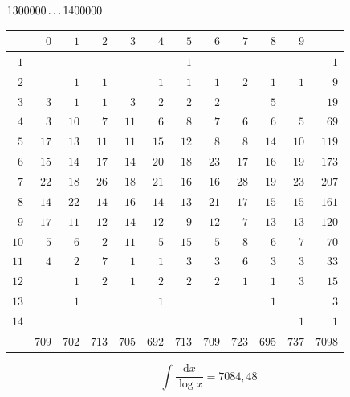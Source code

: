 \par\medskip
\noindent\begin{minipage}{\linewidth}\centering
{}
\(1300000\mathinner{.\,.\,.}1400000\)\par\smallskip
\begingroup\fontsize{10.5}{11.5}\selectfont\setlength{\tabcolsep}{3.5pt}\renewcommand{\arraystretch}{1}
\begin{tabular}{r|rrrrrrrrrr|r}\hline
 & $0$ & $1$ & $2$ & $3$ & $4$ & $5$ & $6$ & $7$ & $8$ & $9$ &  \\ \hline
$1$ &  &  &  &  &  & $1$ &  &  &  &  & $1$ \\
$2$ &  & $1$ & $1$ &  & $1$ & $1$ & $1$ & $2$ & $1$ & $1$ & $9$ \\
$3$ & $3$ & $1$ & $1$ & $3$ & $2$ & $2$ & $2$ &  & $5$ &  & $19$ \\
$4$ & $3$ & $10$ & $7$ & $11$ & $6$ & $8$ & $7$ & $6$ & $6$ & $5$ & $69$ \\
$5$ & $17$ & $13$ & $11$ & $11$ & $15$ & $12$ & $8$ & $8$ & $14$ & $10$ & $119$ \\
$6$ & $15$ & $14$ & $17$ & $14$ & $20$ & $18$ & $23$ & $17$ & $16$ & $19$ & $173$ \\
$7$ & $22$ & $18$ & $26$ & $18$ & $21$ & $16$ & $16$ & $28$ & $19$ & $23$ & $207$ \\
$8$ & $14$ & $22$ & $14$ & $16$ & $14$ & $13$ & $21$ & $17$ & $15$ & $15$ & $161$ \\
$9$ & $17$ & $11$ & $12$ & $14$ & $12$ & $9$ & $12$ & $7$ & $13$ & $13$ & $120$ \\
$10$ & $5$ & $6$ & $2$ & $11$ & $5$ & $15$ & $5$ & $8$ & $6$ & $7$ & $70$ \\
$11$ & $4$ & $2$ & $7$ & $1$ & $1$ & $3$ & $3$ & $6$ & $3$ & $3$ & $33$ \\
$12$ &  & $1$ & $2$ & $1$ & $2$ & $2$ & $2$ & $1$ & $1$ & $3$ & $15$ \\
$13$ &  & $1$ &  &  & $1$ &  &  &  & $1$ &  & $3$ \\
$14$ &  &  &  &  &  &  &  &  &  & $1$ & $1$ \\
\hline
 & $709$ & $702$ & $713$ & $705$ & $692$ & $713$ & $709$ & $723$ & $695$ & $737$ & $7098$ \\ \hline
\end{tabular}\par\endgroup
\setlength{\abovedisplayskip}{6pt}\setlength{\belowdisplayskip}{4pt}
\[\int\frac{\mathrm{d}x}{\log x}=7084{,}48\]
\end{minipage}\par
